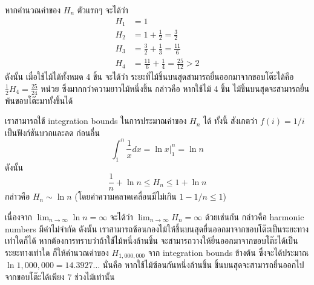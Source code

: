 หากคำนวณค่าของ $H_n$ ตัวแรกๆ จะได้ว่า
\begin{align*}
H_1 &= 1 \\
H_2 &= 1+\frac{1}{2}=\frac{3}{2} \\
H_3 &= \frac{3}{2}+\frac{1}{3}=\frac{11}{6} \\
H_4 &= \frac{11}{6}+\frac{1}{4}=\frac{25}{12}>2
\end{align*}
ดังนั้น เมื่อใช้ไม้ได้ทั้งหมด 4 ชิ้น จะได้ว่า ระยะที่ไม้ชิ้นบนสุดสามารถยื่นออกมาจากขอบโต๊ะได้คือ $\frac{1}{2}H_4=\frac{25}{24}$ หน่วย ซึ่งมากกว่าความยาวไม้หนึ่งชิ้น กล่าวคือ หากใช้ไม้ 4 ชิ้น ไม้ชิ้นบนสุดจะสามารถยื่นพ้นขอบโต๊ะมาทั้งชิ้นได้

เราสามารถใช้ integration bounds ในการประมาณค่าของ $H_n$ ได้ \enskip ทั้งนี้ สังเกตว่า $f(i)=1/i$ เป็นฟังก์ชันบวกและลด \enskip ก่อนอื่น \[\int_1^n\frac{1}{x}dx=\left.\ln x\right|_1^n=\ln n\] ดังนั้น \[\frac{1}{n}+\ln n \leq H_n \leq 1+\ln n\] กล่าวคือ $H_n\sim\ln n$ (โดยค่าความคลาดเคลื่อนมีไม่เกิน $1-1/n\leq 1$)

เนื่องจาก $\lim_{n\to\infty}{\ln n}=\infty$ จะได้ว่า $\lim_{n\to\infty}{H_n}=\infty$ ด้วยเช่นกัน กล่าวคือ harmonic numbers มีค่าไม่จำกัด ดังนั้น เราสามารถซ้อนกองไม้ให้ชิ้นบนสุดยื่นออกมาจากขอบโต๊ะเป็นระยะทางเท่าใดก็ได้ \enskip หากต้องการทราบว่าถ้าใช้ไม้หนึ่งล้านชิ้น จะสามารถวางให้ยื่นออกมาจากขอบโต๊ะได้เป็นระยะทางเท่าใด ก็ให้คำนวณค่าของ $H_{1{,}000{,}000}$ จาก integration bounds ข้างต้น ซึ่งจะได้ประมาณ $\ln{1{,}000{,}000}=14.3927\!\ldots$ \enskip นั่นคือ หากใช้ไม้ซ้อนกันหนึ่งล้านชิ้น ชิ้นบนสุดจะสามารถยื่นออกไปจากขอบโต๊ะได้เพียง 7 ช่วงไม้เท่านั้น
